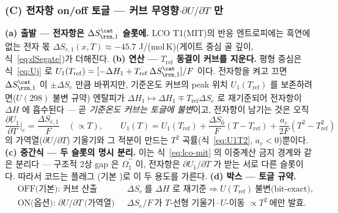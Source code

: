 \subsubsection*{(C) 전자항 on/off 토글 --- 커브 무영향$\cdot$$\partial U/\partial T$ 만}
\textbf{(a) 출발 --- 전자항은 $\Delta S_{\rxn,1}^\cat$ 슬롯에.} LCO T1(MIT)의 반응 엔트로피에는 흑연에 없는
전자 몫 $\Delta S_{e,1}(x,T)\approx-45.7$ J/(mol\,K)(게이트 중심 골 깊이, 식~\eqref{eq:dSegate})가 더해진다.
\textbf{(b) 연산 --- $T_\mathrm{ref}$ 동결이 커브를 지운다.} 평형 중심은 식~\eqref{eq:Uj} 로
$U_1(T_\mathrm{ref})=[-\Delta H_1+T_\mathrm{ref}\,\Delta S_{\rxn,1}^\cat]/F$ 이다. 전자항을 켜고 끄면
$\Delta S_{\rxn,1}^\cat$ 이 $\pm\Delta S_e$ 만큼 바뀌지만, 기준온도 커브의 peak 위치 $U_1(T_\mathrm{ref})$ 를
보존하려면($U(298)$ 불변 규약) 엔탈피가 $\Delta H_1\mapsto\Delta H_1\mp T_\mathrm{ref}\Delta S_e$ 로 재기준되어
전자항이 $\Delta H$ 에 흡수된다 --- 곧 \emph{기준온도 커브는 토글에 불변}이고, 전자항이 남기는 것은 오직
\begin{equation}
\frac{\partial U_1}{\partial T}\bigg|_e=\frac{\Delta S_{e,1}}{F}\quad(\propto T),\qquad
U_1(T)=U_1(T_\mathrm{ref})+\frac{\Delta S_0}{F}(T-T_\mathrm{ref})+\frac{a_e}{2F}(T^2-T_\mathrm{ref}^2)
\label{eq:lcoom-utref}
\end{equation}
의 가역열($\partial U/\partial T$) 기울기와 그 적분이 만드는 $T^2$ 곡률(식~\eqref{eq:U1T2},
$a_e<0$)뿐이다. \textbf{(c) 중간식 --- 두 슬롯의 명시 분리.} 이는 식~\eqref{eq:lco-mit} 의 이중계산
금지 경계와 같은 분리다 --- 구조적 2상 gap 은 $\Omega_1^\cat$ 이, 전자항은 $\partial U_1/\partial T$ 가
받는 서로 다른 슬롯이다. 따라서 코드는 플래그 (기본 )로 이
두 용도를 가른다. \textbf{(d) 박스 --- 토글 규약.}
\begin{equation}
\boxed{\;
\begin{aligned}
&\text{OFF(기본): 커브 산출} && \Delta S_e\ \text{를 }\Delta H\text{ 로 재기준}\Rightarrow U(T_\mathrm{ref})\ \text{불변(bit-exact)},\\
&\text{ON(옵션): }\partial U/\partial T\ \text{(가역열)} && \Delta S_e/F\ \text{가 }T\text{-선형 기울기}\cdot U\text{-이동 }\propto T^2\ \text{에만 발효}.
\end{aligned}\;}
\label{eq:lcoom-toggle}
\end{equation}

